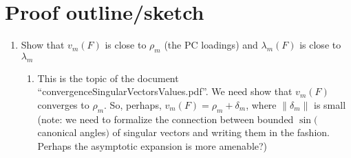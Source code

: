 \documentclass[11pt]{article}
\newcommand{\norm}[1]{\lVert #1 \rVert}
\begin{document}
\section{Proof outline/sketch}
\begin{enumerate}
\item Show that $v_m(F)$ is close to $\rho_m$ (the PC loadings) and $\lambda_m(F)$ is close to $\lambda_m$
\begin{enumerate}
\item This is the topic of the document ``convergenceSingularVectorsValues.pdf''.  We need show that $v_m(F)$ converges to $\rho_m$.  So, perhaps, $v_m(F) = \rho_m + \delta_m$,
where $\norm{\delta_m}$ is small (note: we need to formalize the connection between bounded $\sin($ canonical angles$)$ of singular vectors and writing them in the fashion.  Perhaps
the asymptotic expansion is more amenable?)

\end{enumerate}


\end{enumerate}
\end{document}
